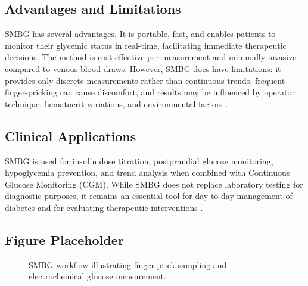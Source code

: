 \documentclass[12pt,a4paper]{article}  %
\begin{document}
\subsection{Advantages and Limitations}
SMBG has several advantages. It is portable, fast, and enables patients to monitor their glycemic status in real-time, facilitating immediate therapeutic decisions. The method is cost-effective per measurement and minimally invasive compared to venous blood draws. However, SMBG does have limitations: it provides only discrete measurements rather than continuous trends, frequent finger-pricking can cause discomfort, and results may be influenced by operator technique, hematocrit variations, and environmental factors \cite{Heinemann2018}.

\subsection{Clinical Applications}
SMBG is used for insulin dose titration, postprandial glucose monitoring, hypoglycemia prevention, and trend analysis when combined with Continuous Glucose Monitoring (CGM). While SMBG does not replace laboratory testing for diagnostic purposes, it remains an essential tool for day-to-day management of diabetes and for evaluating therapeutic interventions \cite{ADA2025}.

\subsection{Figure Placeholder}
\begin{figure}[h!]
\centering
{}
\caption{SMBG workflow illustrating finger-prick sampling and electrochemical glucose measurement.}
\label{fig:smbg_workflow}
\end{figure}



\end{document}
